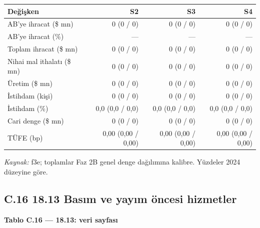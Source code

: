 \begin{longtable}[]{@{}lrrr@{}}
\toprule\noalign{}
\textbf{Değişken} & \textbf{S2} & \textbf{S3} & \textbf{S4} \\
\midrule\noalign{}
\endhead
\bottomrule\noalign{}
\endlastfoot
AB'ye ihracat (\$ mn) & 0 (0 / 0) & 0 (0 / 0) & 0 (0 / 0) \\
AB'ye ihracat (\%) & --- & --- & --- \\
Toplam ihracat (\$ mn) & 0 (0 / 0) & 0 (0 / 0) & 0 (0 / 0) \\
Nihai mal ithalatı (\$ mn) & 0 (0 / 0) & 0 (0 / 0) & 0 (0 / 0) \\
Üretim (\$ mn) & 0 (0 / 0) & 0 (0 / 0) & 0 (0 / 0) \\
İstihdam (kişi) & 0 (0 / 0) & 0 (0 / 0) & 0 (0 / 0) \\
İstihdam (\%) & 0,0 (0,0 / 0,0) & 0,0 (0,0 / 0,0) & 0,0 (0,0 / 0,0) \\
Cari denge (\$ mn) & 0 (0 / 0) & 0 (0 / 0) & 0 (0 / 0) \\
TÜFE (bp) & 0,00 (0,00 / 0,00) & 0,00 (0,00 / 0,00) & 0,00 (0,00 / 0,00) \\
\end{longtable}

\endgroup

\emph{Kaynak:} \etiketT{} f3e; toplamlar Faz 2B genel denge dağılımına kalibre. Yüzdeler 2024 düzeyine göre.

\hypertarget{nace_kartlar_16-18-c16-1813-basux131m-ve-yayux131m-uxf6ncesi-hizmetler}{%
\subsection{C.16 18.13 Basım ve yayım öncesi hizmetler}\label{nace_kartlar_16-18-c16-1813-basux131m-ve-yayux131m-uxf6ncesi-hizmetler}}


\textbf{Tablo C.16 --- 18.13: veri sayfası}

\nopagebreak[4]

\begingroup\gbtablo\small

